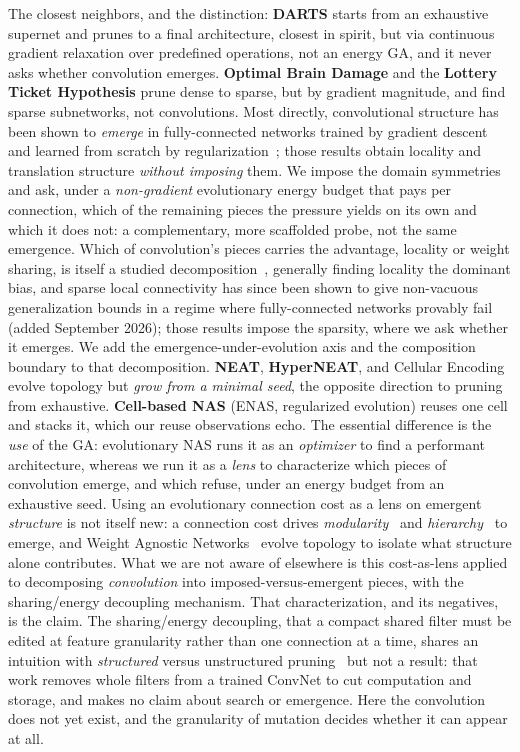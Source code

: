 \documentclass[11pt]{article}
\begin{document}
The closest neighbors, and the distinction: \textbf{DARTS} starts from an exhaustive supernet and
prunes to a final architecture, closest in spirit, but via continuous gradient relaxation over
predefined operations, not an energy GA, and it never asks whether convolution emerges. \textbf{Optimal
Brain Damage} and the \textbf{Lottery Ticket Hypothesis} prune dense to sparse, but by gradient
magnitude, and find sparse subnetworks, not convolutions. Most directly, convolutional structure has been
shown to \emph{emerge} in fully-connected networks trained by gradient descent~\cite{ingrosso} and learned
from scratch by regularization~\cite{neyshabur}; those results obtain locality and translation structure
\emph{without imposing} them. We impose the domain symmetries and ask, under a \emph{non-gradient}
evolutionary energy budget that pays per connection, which of the remaining pieces the pressure yields on
its own and which it does not: a complementary, more scaffolded probe, not the same emergence. Which of
convolution's pieces carries the advantage, locality or weight sharing, is itself a studied
decomposition~\cite{indbias,localshare}, generally finding locality the dominant bias, and sparse local
connectivity has since been shown to give non-vacuous generalization bounds in a regime where
fully-connected networks provably fail~\cite{liang2026} (added September 2026); those results impose the
sparsity, where we ask whether it emerges. We add the emergence-under-evolution axis and the composition
boundary to that decomposition. \textbf{NEAT}, \textbf{HyperNEAT}, and
Cellular Encoding evolve topology but \emph{grow from a minimal seed}, the opposite direction to pruning
from exhaustive. \textbf{Cell-based NAS} (ENAS, regularized evolution) reuses one cell and stacks it,
which our reuse observations echo. The essential difference is the \emph{use} of the GA: evolutionary NAS
runs it as an \emph{optimizer} to find a performant architecture, whereas we run it as a \emph{lens} to
characterize which pieces of convolution emerge, and which refuse, under an energy budget from an
exhaustive seed. Using an evolutionary connection cost as a lens on emergent \emph{structure} is not itself
new: a connection cost drives \emph{modularity}~\cite{clune} and \emph{hierarchy}~\cite{mengistu} to emerge,
and Weight Agnostic Networks~\cite{wann} evolve topology to isolate what structure alone contributes. What
we are not aware of elsewhere is this cost-as-lens applied to decomposing \emph{convolution} into
imposed-versus-emergent pieces, with the sharing/energy decoupling mechanism. That characterization, and its
negatives, is the claim. The sharing/energy decoupling, that a compact shared filter must be edited at
feature granularity rather than one connection at a time, shares an intuition with \emph{structured} versus
unstructured pruning~\cite{prunefilters} but not a result: that work removes whole filters from a trained
ConvNet to cut computation and storage, and makes no claim about search or emergence. Here the convolution
does not yet exist, and the granularity of mutation decides whether it can appear at all.
\end{document}
